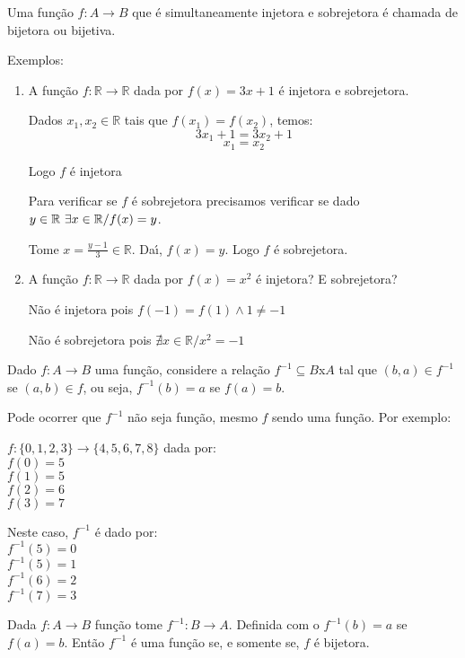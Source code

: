 \begin{definicao} Uma fun{\c c}{\~a}o $f:A\rightarrow B$ que {\'e} simultaneamente injetora e sobrejetora {\'e} chamada de bijetora ou bijetiva.
\end{definicao}

Exemplos:
\begin{enumerate}
\item A fun{\c c}{\~a}o $f:\mathbb{R}\rightarrow\mathbb{R}$ dada por $f(x)=3x+1$ {\'e} injetora e sobrejetora.

Dados $x_{1}, x_{2}\in\mathbb{R}$ tais que $f(x_{1})=f(x_{2})$, temos:
\[3x_{1}+1=3x_{2}+1\]
\[x_{1}=x_{2}\]

Logo $f$ {\'e} injetora

Para verificar se $f$ {\'e} sobrejetora precisamos verificar se dado $y\in\mathbb{R}\\ \ \exists x\in\mathbb{R}/f(x)=y$.

Tome $x=\displaystyle\frac{y-1}{3}\in\mathbb{R}$. Da{\'\i}, $f(x)=y$. Logo $f$ {\'e} sobrejetora.
\item A fun{\c c}{\~a}o $f:\mathbb{R}\rightarrow\mathbb{R}$ dada por $f(x)=x^{2}$ {\'e} injetora? E sobrejetora?

N{\~a}o {\'e} injetora pois $f(-1)=f(1)\wedge 1\neq -1$

N{\~a}o {\'e} sobrejetora pois $\nexists x\in\mathbb{R}/x^{2}=-1$

\end{enumerate}

Dado $f:A\rightarrow B$ uma fun{\c c}{\~a}o, considere a rela{\c c}{\~a}o $f^{-1}\subseteq B$x$A$ tal que $(b,a)\in f^{-1}$ se $(a,b)\in f$, ou seja, $f^{-1}(b)=a$ se $f(a)=b$.

Pode ocorrer que $f^{-1}$ n{\~a}o seja fun{\c c}{\~a}o, mesmo $f$ sendo uma fun{\c c}{\~a}o. Por exemplo:

$f:\{0,1,2,3\}\rightarrow\{4,5,6,7,8\}$ dada por:\\
$f(0)=5$\\
$f(1)=5$\\
$f(2)=6$\\
$f(3)=7$

Neste caso, $f^{-1}$ {\'e} dado por:\\
$f^{-1}(5)=0$\\
$f^{-1}(5)=1$\\
$f^{-1}(6)=2$\\
$f^{-1}(7)=3$

\begin{teorema}
Dada $f:A\rightarrow B$ fun{\c c}{\~a}o tome $f^{-1}:B\rightarrow A$. Definida com o $f^{-1}(b)=a$ se $f(a)=b$. Ent{\~a}o $f^{-1}$ {\'e} uma fun{\c c}{\~a}o se, e somente se, $f$ {\'e} bijetora.
\end{teorema}


